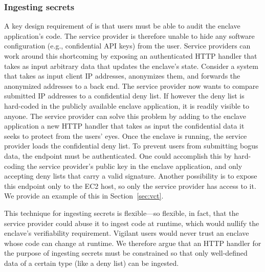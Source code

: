 \subsubsection{Ingesting secrets}%
\label{sec:secrets}

A key design requirement of \tool{} is that users must be able to audit the
enclave application's code.  The service provider is therefore unable to hide
any software configuration (e.g., confidential API keys) from the user.  Service
providers can work around this shortcoming by exposing an authenticated HTTP
handler that takes as input arbitrary data that updates the enclave's state.
Consider a system that takes as input client IP addresses, anonymizes them, and
forwards the anonymized addresses to a back end.  The service provider now wants
to compare submitted IP addresses to a confidential deny list.  If however the
deny list is hard-coded in the publicly available enclave application, it is
readily visible to anyone.  The service provider can solve this problem by
adding to the enclave application a new HTTP handler that takes as input the
confidential data it seeks to protect from the users' eyes.  Once the enclave is
running, the service provider loads the confidential deny list.  To prevent
users from submitting bogus data, the endpoint must be authenticated.  One
could accomplish this by hard-coding the service provider's public key in the
enclave application, and only accepting deny lists that carry a valid signature.
Another possibility is to expose this endpoint only to the EC2 host, so only the
service provider has access to it.  We provide an example of this in
Section~\ref{sec:vct}.

This technique for ingesting secrets is flexible---so flexible, in fact, that
the service provider could abuse it to ingest code at runtime, which would
nullify the enclave's verifiability requirement.  Vigilant users would never
trust an enclave whose code can change at runtime.  We therefore argue that an
HTTP handler for the purpose of ingesting secrets must be constrained so that
only well-defined data of a certain type (like a deny list) can be ingested.
